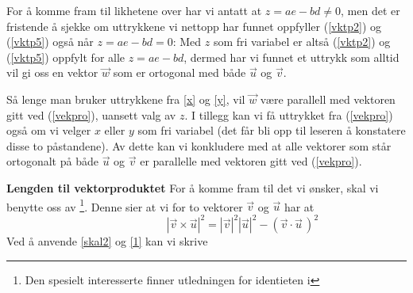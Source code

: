 {For å komme fram til likhetene over har vi antatt at $ {z=ae-bd\neq 0} $, men det er fristende å sjekke om uttrykkene vi nettopp har funnet oppfyller (\ref{vktp2}) og (\ref{vktp5}) også når ${ z=ae-bd=0} $:
Med $ z $ som fri variabel er altså (\ref{vktp2}) og (\ref{vktp5})  oppfylt for alle ${ z=ae-bd} $, dermed har vi funnet et uttrykk som alltid vil gi oss en vektor $ \vec{w} $ som er ortogonal med både $ \vec{u} $ og $ \vec{v} $. \vsk

Så lenge man bruker uttrykkene fra \eqref{x} og \eqref{y}, vil $ \vec{w} $ være parallell med vektoren gitt ved (\ref{vekpro}), uansett valg av $ z $. I tillegg kan vi få uttrykket fra (\ref{vekpro}) også om vi velger $ x $ eller $ y $ som fri variabel (det får bli opp til leseren å konstatere disse to påstandene).\label{allekrypropar} Av dette kan vi konkludere med at alle vektorer som står ortogonalt på både $ \vec{u} $ og $ \vec{v} $ er parallelle med vektoren gitt ved (\ref{vekpro}). \vsk

\textbf{Lengden til vektorproduktet}\os
For å komme fram til det vi ønsker, skal vi benytte oss av \footnote{Den spesielt interesserte finner utledningen for identieten i }. Denne sier at vi for to vektorer
$ \vec{v} $ og $ \vec{u} $ har at
\[\phantom{testingcloservl} |\vec{v}\times\vec{u}|^2=|\vec{v}|^2|\vec{u}|^2-(\vec{v}\cdot\vec{u}\,)^2 \tag{Lagranges identitet}\]
Ved å anvende \eqref{skal2} og \eqref{1} kan vi skrive 
}
